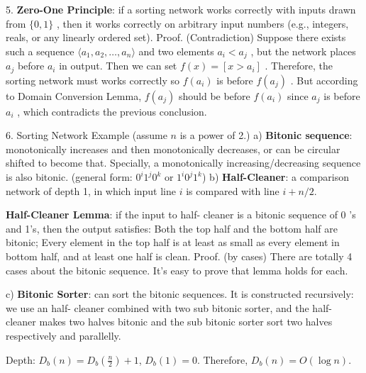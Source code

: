 \documentclass[10pt,a4paper]{article}
\begin{document}
5. \textbf{Zero-One Principle}: if a sorting network works correctly with inputs drawn from \(\{0,1\}\) , then it works correctly on arbitrary input numbers (e.g., integers, reals, or any linearly ordered set).
Proof. (Contradiction) Suppose there exists such a sequence \(\langle a_{1},a_{2},\dots ,a_{n}\rangle\) and two elements \(a_{i}< a_{j}\) , but the network places \(a_{j}\) before \(a_{i}\) in output. Then we can set \(f(x) = [x > a_{i}]\) . Therefore, the sorting network must works correctly so \(f(a_{i})\) is before \(f(a_{j})\) . But according to Domain Conversion Lemma, \(f(a_{j})\) should be before \(f(a_{i})\) since \(a_{j}\) is before \(a_{i}\) , which contradicts the previous conclusion.

6. Sorting Network Example (assume \(n\) is a power of 2.)
a) \textbf{Bitonic sequence}: monotonically increases and then monotonically decreases, or can be circular shifted to become that. Specially, a monotonically increasing/decreasing sequence is also bitonic. (general form: \(0^{i}1^{j}0^{k}\) or \(1^{i}0^{j}1^{k}\))
b) \textbf{Half-Cleaner}: a comparison network of depth 1, in which input line \(i\) is compared with line \(i + n / 2\).

\begin{center}
\end{center}

\textbf{Half-Cleaner Lemma}: if the input to half- cleaner is a bitonic sequence of \(0\) 's and 1's, then the output satisfies: Both the top half and the bottom half are bitonic; Every element in the top half is at least as small as every element in bottom half, and at least one half is clean.
Proof. (by cases) There are totally 4 cases about the bitonic sequence. It's easy to prove that lemma holds for each.

c) \textbf{Bitonic Sorter}: can sort the bitonic sequences. It is constructed recursively: we use an half- cleaner combined with two sub bitonic sorter, and the half- cleaner makes two halves bitonic and the sub bitonic sorter sort two halves respectively and parallelly.

\begin{center}
\end{center}

Depth: \(D_{b}(n) = D_{b}\left(\frac{n}{2}\right) + 1\), \(D_{b}(1) = 0\). Therefore, \(D_{b}(n) = O(\log n)\).
\end{document}
